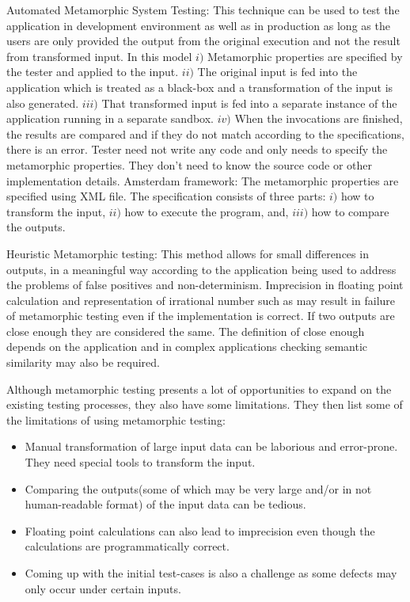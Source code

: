 		Automated Metamorphic System Testing: This technique can be used to test the application in development environment as well as in production as long as the users are only provided the output from the original execution and not the result from transformed input. In this model $i)$ Metamorphic properties are specified by the tester and applied to the input. $ii)$ The original input is fed into the application which is treated as a black-box and a transformation of the input is also generated. $iii)$ That transformed input is fed into a separate instance of the application running in a separate sandbox. $iv)$ When the invocations are finished, the results are compared and if they do not match according to the specifications, there is an error.
		Tester need not write any code and only needs to specify the metamorphic properties. They don't need to know the source code or other implementation details.
		Amsterdam framework: The metamorphic properties are specified using XML file. The specification consists of three parts: $i)$ how to transform the input, $ii)$ how to execute the program, and, $iii)$ how to compare the outputs.\par
		Heuristic Metamorphic testing: This method allows for small differences in outputs, in a meaningful way according to the application being used to address the problems of false positives and non-determinism. Imprecision in floating point calculation and representation of irrational number such as may result in failure of metamorphic testing even if the implementation is correct. If two outputs are close enough they are considered the same. The definition of close enough depends on the application and in complex applications checking semantic similarity may also be required.\cite{Murphy2009}
		
		
Although metamorphic testing presents a lot of opportunities to expand on the existing testing processes, they also have some limitations. They then list some of the limitations of using metamorphic testing: \cite{Murphy2009}
		\begin{itemize}
			\item	Manual transformation of large input data can be laborious and error-prone. They need special tools to transform the input.
			\item Comparing the outputs(some of which may be very large and/or in not human-readable format) of the input data can be tedious.
			\item Floating point calculations can also lead to imprecision even though the calculations are programmatically correct.
			\item Coming up with the initial test-cases is also a challenge as some defects may only occur under certain inputs.
		\end{itemize}
		
